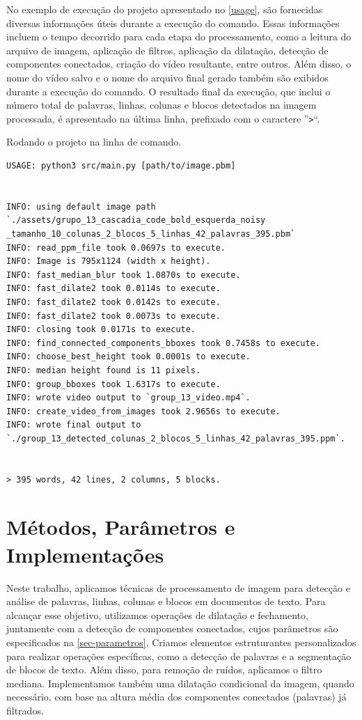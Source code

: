 \documentclass[english, 
               brazil, 
               bsc] %
               {dcomp-abntex2}
\begin{document}
No exemplo de execução do projeto apresentado no \autoref{usage}, são fornecidas diversas informações úteis durante a execução do comando. Essas informações incluem o tempo decorrido para cada etapa do processamento, como a leitura do arquivo de imagem, aplicação de filtros, aplicação da dilatação, detecção de componentes conectados, criação do vídeo resultante, entre outros. Além disso, o nome do vídeo salvo e o nome do arquivo final gerado também são exibidos durante a execução do comando. O resultado final da execução, que inclui o número total de palavras, linhas, colunas e blocos detectados na imagem processada, é apresentado na última linha, prefixado com o caractere ''\texttt{>}``.


\begin{codigo}[h]
  \caption{\small Rodando o projeto na linha de comando.}
 \label{usage}
\begin{lstlisting}
USAGE: python3 src/main.py [path/to/image.pbm]


INFO: using default image path `./assets/grupo_13_cascadia_code_bold_esquerda_noisy
_tamanho_10_colunas_2_blocos_5_linhas_42_palavras_395.pbm`
INFO: read_ppm_file took 0.0697s to execute.
INFO: Image is 795x1124 (width x height).
INFO: fast_median_blur took 1.0870s to execute.
INFO: fast_dilate2 took 0.0114s to execute.
INFO: fast_dilate2 took 0.0142s to execute.
INFO: fast_dilate2 took 0.0073s to execute.
INFO: closing took 0.0171s to execute.
INFO: find_connected_components_bboxes took 0.7458s to execute.
INFO: choose_best_height took 0.0001s to execute.
INFO: median height found is 11 pixels.
INFO: group_bboxes took 1.6317s to execute.
INFO: wrote video output to `group_13_video.mp4`.
INFO: create_video_from_images took 2.9656s to execute.
INFO: wrote final output to `./group_13_detected_colunas_2_blocos_5_linhas_42_palavras_395.ppm`.


> 395 words, 42 lines, 2 columns, 5 blocks.
\end{lstlisting}
\end{codigo}




\chapter{Métodos, Parâmetros e Implementações}\label{ch-detalhes}


Neste trabalho, aplicamos técnicas de processamento de imagem para detecção e análise de palavras, linhas, colunas e blocos em documentos de texto. Para alcançar esse objetivo, utilizamos operações de dilatação e fechamento, juntamente com a detecção de componentes conectados, cujos parâmetros são especificados na \autoref{sec-parametros}. Criamos elementos estruturantes personalizados para realizar operações específicas, como a detecção de palavras e a segmentação de blocos de texto. Além disso, para remoção de ruídos, aplicamos o filtro mediana. Implementamos também uma dilatação condicional da imagem, quando necessário, com base na altura média dos componentes conectados (palavras) já filtrados.
\end{document}
